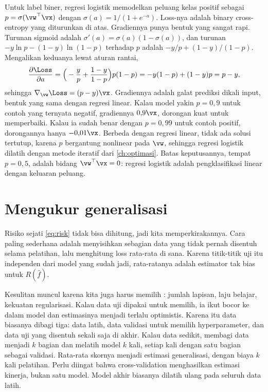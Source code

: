 Untuk label biner, regresi logistik memodelkan peluang kelas positif sebagai $p=\sigma(\vw^\top\vx)$ dengan
$\sigma(a)=1/(1+e^{-a})$. Loss-nya adalah binary cross-entropy yang diturunkan di atas. Gradiennya punya bentuk yang sangat
rapi. Turunan sigmoid adalah $\sigma'(a)=\sigma(a)(1-\sigma(a))$, dan turunan $-y\ln p-(1-y)\ln(1-p)$ terhadap $p$ adalah
$-y/p+(1-y)/(1-p)$. Mengalikan keduanya lewat aturan rantai,
\begin{equation}
\frac{\partial\Loss}{\partial a}=\Big(-\frac yp+\frac{1-y}{1-p}\Big)p(1-p)=-y(1-p)+(1-y)p=p-y,
\end{equation}
sehingga $\nabla_{\vw}\Loss=(p-y)\vx$. Gradiennya adalah galat prediksi dikali input, bentuk yang sama dengan regresi linear.
Kalau model yakin $p=0{,}9$ untuk contoh yang ternyata negatif, gradiennya $0{,}9\vx$, dorongan kuat untuk memperbaiki. Kalau
ia sudah benar dengan $p=0{,}99$ untuk contoh positif, dorongannya hanya $-0{,}01\vx$. Berbeda dengan regresi linear, tidak
ada solusi tertutup, karena $p$ bergantung nonlinear pada $\vw$, sehingga regresi logistik dilatih dengan metode iteratif
dari \cref{ch:optimasi}. Batas keputusannya, tempat $p=0{,}5$, adalah bidang $\vw^\top\vx=0$: regresi logistik adalah
pengklasifikasi linear dengan keluaran peluang.

\section{Mengukur generalisasi}

Risiko sejati \eqref{eq:risk} tidak bisa dihitung, jadi kita memperkirakannya. Cara paling
sederhana adalah menyisihkan sebagian data yang tidak pernah disentuh selama pelatihan, lalu
menghitung loss rata-rata di sana. Karena titik-titik uji itu independen dari model yang sudah
jadi, rata-ratanya adalah estimator tak bias untuk $R(\hat f)$.

Kesulitan muncul karena kita juga harus memilih : jumlah lapisan, laju
belajar, kekuatan regularisasi. Kalau data uji dipakai untuk memilih, ia ikut bocor ke dalam
model dan estimasinya menjadi terlalu optimistis. Karena itu data biasanya dibagi tiga: data
latih, data validasi untuk memilih hyperparameter, dan data uji yang disentuh sekali saja di
akhir. Kalau data sedikit,  membagi data menjadi $k$ bagian dan
melatih model $k$ kali, setiap kali dengan satu bagian sebagai validasi. Rata-rata skornya
menjadi estimasi generalisasi, dengan biaya $k$ kali pelatihan. Perlu diingat bahwa
cross-validation menghasilkan estimasi kinerja, bukan satu model. Model akhir biasanya dilatih
ulang pada seluruh data latih.

